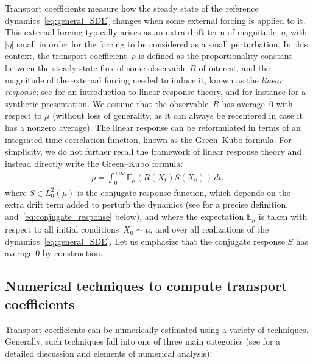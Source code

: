 \documentclass[11pt]{article}
\newcommand{\E}{\mathbb{E}}
\theoremstyle{definition}
\begin{document}
Transport coefficients measure how the steady state of the reference dynamics~\eqref{eq:general_SDE} changes when some external forcing is applied to it. This external forcing typically arises as an extra drift term of magnitude~$\eta$, with~$|\eta|$ small in order for the forcing to be considered as a small perturbation. In this context, the transport coefficient~$\rho$ is defined as the proportionality constant between the steady-state flux of some observable $R$ of interest, and the magnitude of the external forcing needed to induce it, known as the \emph{linear response}; see \cite[Chapter 8]{chandler1987} for an introduction to linear response theory, and for instance \cite[Section 2]{spacek2023} for a synthetic presentation. We assume that the observable~$R$ has average~0 with respect to $\mu$ (without loss of generality, as it can always be recentered in case it has a nonzero average). The linear response can be reformulated in terms of an integrated time-correlation function, known as the Green--Kubo formula. For simplicity, we do not further recall the framework of linear response theory and instead directly write the Green--Kubo formula:
\begin{align}
  \rho = \int_0^{+\infty} \E_\mu(R(X_t) S(X_0)) \, dt,\label{eq:gk}
\end{align}
where $S \in L^2_0(\mu)$ is the conjugate response function, which depends on the extra drift term added to perturb the dynamics (see \cite[Section 5.2.3]{lelievre2016} for a precise definition, and~\eqref{eq:conjugate_response} below), and where the expectation $\E_\mu$ is taken with respect to all initial conditions~$X_0\sim \mu$, and over all realizations of the dynamics~\eqref{eq:general_SDE}. Let us emphasize that the conjugate response $S$ has average 0 by construction.

\subsection{Numerical techniques to compute transport coefficients}
\label{subsec:num_tech}
Transport coefficients can be numerically estimated using a variety of techniques. Generally, such techniques fall into one of three main categories (see \cite{lelievre2016,stoltz2024} for a detailed discussion and elements of numerical analysis):
\end{document}
